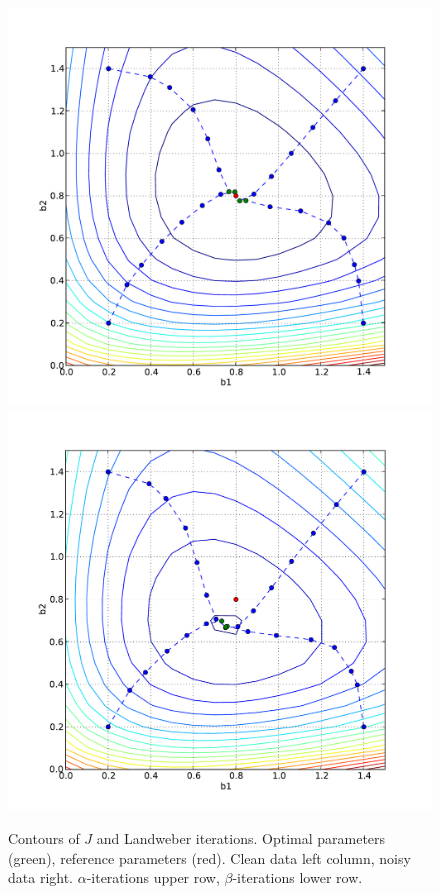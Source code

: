 \begin{figure}
  \includegraphics[width=\twofigs]{chapters/schroll/pdf/b1b2scan4.pdf}
  \includegraphics[width=\twofigs]{chapters/schroll/pdf/b1b2scan4-5.pdf}
  \caption{Contours of $J$ and Landweber iterations. Optimal parameters
    (green), reference parameters (red).
    Clean data left column, noisy data right. $\alpha$-iterations
    upper row, $\beta$-iterations lower row.}
  \label{fig2}
\end{figure}

